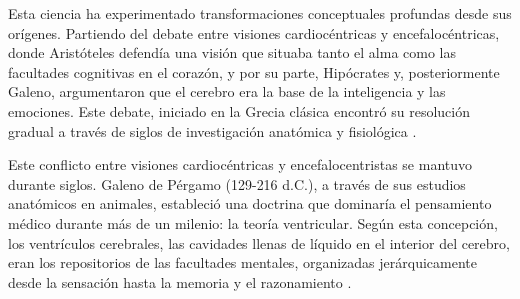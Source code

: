 Esta ciencia ha experimentado transformaciones conceptuales profundas desde sus orígenes. Partiendo del debate entre visiones cardiocéntricas y encefalocéntricas, donde Aristóteles defendía una visión que situaba tanto el alma como las facultades cognitivas en el corazón, y por su parte, Hipócrates y, posteriormente Galeno, argumentaron que el cerebro era la base de la inteligencia y las emociones. Este debate, iniciado en la Grecia clásica encontró su resolución gradual a través de siglos de investigación anatómica y fisiológica \citep{blanco2014historia}.


Este conflicto entre visiones cardiocéntricas y encefalocentristas se mantuvo durante siglos. Galeno de Pérgamo (129-216 d.C.), a través de sus estudios anatómicos en animales, estableció una doctrina que dominaría el pensamiento médico durante más de un milenio: la teoría ventricular. Según esta concepción, los ventrículos cerebrales, las cavidades llenas de líquido en el interior del cerebro, eran los repositorios de las facultades mentales, organizadas jerárquicamente desde la sensación hasta la memoria y el razonamiento \citep{blanco2014historia}.




